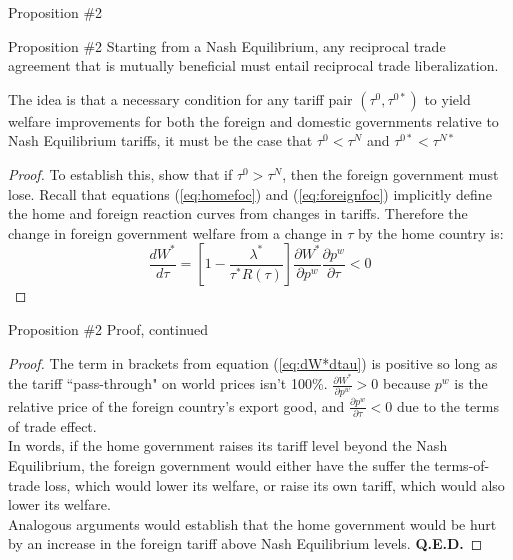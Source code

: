 \documentclass[aspectratio=169]{beamer}
\begin{document}
\begin{frame}{Proposition \#2}

\begin{theorem}{Proposition \#2}
    Starting from a Nash Equilibrium, any reciprocal trade agreement that is mutually beneficial must entail reciprocal trade liberalization.
\end{theorem}
The idea is that a necessary condition for any tariff pair $ \left( \tau^{0}, \tau^{0 *} \right) $ to yield welfare improvements for both the foreign and domestic governments relative to Nash Equilibrium tariffs, it must be the case that $ \tau^{0} < \tau^{N} $ and $ \tau^{0*} < \tau^{N*} $
\begin{proof}
    To establish this, show that if $ \tau^{0} > \tau^{N} $, then the foreign government must lose.  Recall that equations (\ref{eq:homefoc}) and (\ref{eq:foreignfoc}) implicitly define the home and foreign reaction curves from changes in tariffs.  Therefore the change in foreign government welfare from a change in $ \tau $  by the home country is:
    \begin{equation}
        \frac{d W^{*}}{d \tau} = \left[ 1 - \frac{\lambda^{*}}{\tau^{*} R\left( \tau \right)} \right] \frac{\partial W^{*}}{\partial p^{w}} \frac{\partial p^{w}}{\partial \tau} < 0
        \label{eq:dW*dtau}
    \end{equation}
\end{proof}

\end{frame}


\begin{frame}{Proposition \#2 Proof, continued}

\begin{proof}
    The term in brackets from equation (\ref{eq:dW*dtau}) is positive so long as the tariff ``pass-through" on world prices isn’t 100\%.  $ \frac{\partial W^{*}}{\partial p^{w}} > 0 $ because $ p^{w} $ is the relative price of the foreign country’s export good, and $ \frac{\partial p^{w}}{\partial \tau} < 0 $ due to the terms of trade effect. \\
    In words, if the home government raises its tariff level beyond the Nash Equilibrium, the foreign government would either have the suffer the terms-of-trade loss, which would lower its welfare, or raise its own tariff, which would also lower its welfare. \\
    Analogous arguments would establish that the home government would be hurt by an increase in the foreign tariff above Nash Equilibrium levels. \textbf{Q.E.D.}
\end{proof}
    
\end{frame}

\end{document}
